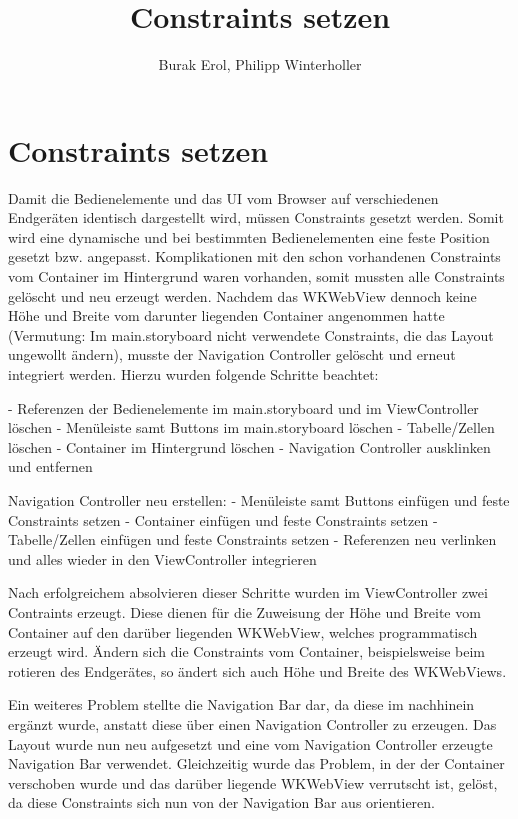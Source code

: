 
\title{Constraints setzen}
\author{Burak Erol, Philipp Winterholler}

\section{Constraints setzen}

Damit die Bedienelemente und das UI vom Browser auf verschiedenen Endgeräten identisch dargestellt wird, müssen Constraints gesetzt werden. Somit wird eine dynamische und bei bestimmten Bedienelementen eine feste Position gesetzt bzw. angepasst. Komplikationen mit den schon vorhandenen Constraints vom Container im Hintergrund waren vorhanden, somit mussten alle Constraints gelöscht und neu erzeugt werden. Nachdem das WKWebView dennoch keine Höhe und Breite vom darunter liegenden Container angenommen hatte (Vermutung: Im main.storyboard nicht verwendete Constraints, die das Layout ungewollt ändern), musste der Navigation Controller gelöscht und erneut integriert werden. Hierzu wurden folgende Schritte beachtet:

- Referenzen der Bedienelemente im main.storyboard und im ViewController löschen 
- Menüleiste samt Buttons im main.storyboard löschen 
- Tabelle/Zellen löschen
- Container im Hintergrund löschen
- Navigation Controller ausklinken und entfernen

Navigation Controller neu erstellen:
- Menüleiste samt Buttons einfügen und feste Constraints setzen
- Container einfügen und feste Constraints setzen
- Tabelle/Zellen einfügen und feste Constraints setzen
- Referenzen neu verlinken und alles wieder in den ViewController integrieren

Nach erfolgreichem absolvieren dieser Schritte wurden im ViewController zwei Contraints erzeugt. Diese dienen für die Zuweisung der Höhe und Breite vom Container auf den darüber liegenden WKWebView, welches programmatisch erzeugt wird. Ändern sich die Constraints vom Container, beispielsweise beim rotieren des Endgerätes, so ändert sich auch Höhe und Breite des WKWebViews.

Ein weiteres Problem stellte die Navigation Bar dar, da diese im nachhinein ergänzt wurde, anstatt diese über einen Navigation Controller zu erzeugen. Das Layout wurde nun neu aufgesetzt und eine vom Navigation Controller erzeugte Navigation Bar verwendet. Gleichzeitig wurde das Problem, in der der Container verschoben wurde und das darüber liegende WKWebView verrutscht ist, gelöst, da diese Constraints sich nun von der Navigation Bar aus orientieren.

